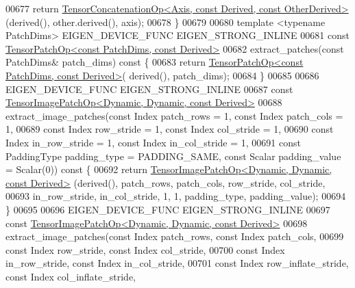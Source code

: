 \begin{DoxyCode}
00677       \textcolor{keywordflow}{return} \hyperlink{class_eigen_1_1_tensor_concatenation_op}{TensorConcatenationOp<Axis, const Derived, const OtherDerived>}
      (derived(), other.derived(), axis);
00678     \}
00679 
00680     \textcolor{keyword}{template} <\textcolor{keyword}{typename} PatchDims> EIGEN\_DEVICE\_FUNC EIGEN\_STRONG\_INLINE
00681     \textcolor{keyword}{const} \hyperlink{class_eigen_1_1_tensor_patch_op}{TensorPatchOp<const PatchDims, const Derived>}
00682     extract\_patches(\textcolor{keyword}{const} PatchDims& patch\_dims)\textcolor{keyword}{ const }\{
00683       \textcolor{keywordflow}{return} \hyperlink{class_eigen_1_1_tensor_patch_op}{TensorPatchOp<const PatchDims, const Derived>}(
      derived(), patch\_dims);
00684     \}
00685 
00686     EIGEN\_DEVICE\_FUNC EIGEN\_STRONG\_INLINE
00687     \textcolor{keyword}{const} \hyperlink{class_eigen_1_1_tensor_image_patch_op}{TensorImagePatchOp<Dynamic, Dynamic, const Derived>}
00688     extract\_image\_patches(\textcolor{keyword}{const} Index patch\_rows = 1, \textcolor{keyword}{const} Index patch\_cols = 1,
00689                           \textcolor{keyword}{const} Index row\_stride = 1, \textcolor{keyword}{const} Index col\_stride = 1,
00690                           \textcolor{keyword}{const} Index in\_row\_stride = 1, \textcolor{keyword}{const} Index in\_col\_stride = 1,
00691                           \textcolor{keyword}{const} PaddingType padding\_type = PADDING\_SAME, \textcolor{keyword}{const} Scalar padding\_value = 
      Scalar(0))\textcolor{keyword}{ const }\{
00692       \textcolor{keywordflow}{return} \hyperlink{class_eigen_1_1_tensor_image_patch_op}{TensorImagePatchOp<Dynamic, Dynamic, const Derived>}
      (derived(), patch\_rows, patch\_cols, row\_stride, col\_stride,
00693                                                                  in\_row\_stride, in\_col\_stride, 1, 1, 
      padding\_type, padding\_value);
00694     \}
00695 
00696     EIGEN\_DEVICE\_FUNC EIGEN\_STRONG\_INLINE
00697     \textcolor{keyword}{const} \hyperlink{class_eigen_1_1_tensor_image_patch_op}{TensorImagePatchOp<Dynamic, Dynamic, const Derived>}
00698     extract\_image\_patches(\textcolor{keyword}{const} Index patch\_rows, \textcolor{keyword}{const} Index patch\_cols,
00699                           \textcolor{keyword}{const} Index row\_stride, \textcolor{keyword}{const} Index col\_stride,
00700                           \textcolor{keyword}{const} Index in\_row\_stride, \textcolor{keyword}{const} Index in\_col\_stride,
00701                           \textcolor{keyword}{const} Index row\_inflate\_stride, \textcolor{keyword}{const} Index col\_inflate\_stride,

\end{DoxyCode}
